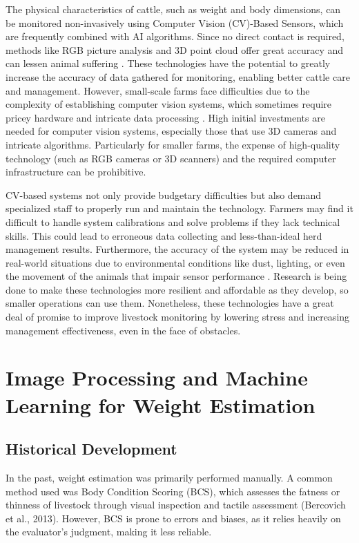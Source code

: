 {The physical characteristics of cattle, such as weight and body dimensions, can be monitored non-invasively using Computer Vision (CV)-Based Sensors, which are frequently combined with AI algorithms. Since no direct contact is required, methods like RGB picture analysis and 3D point cloud offer great accuracy and can lessen animal suffering \citep{ma2024computer}. These technologies have the potential to greatly increase the accuracy of data gathered for monitoring, enabling better cattle care and management. However, small-scale farms face difficulties due to the complexity of establishing computer vision systems, which sometimes require pricey hardware and intricate data processing \citep{terence2024systematic}.  High initial investments are needed for computer vision systems, especially those that use 3D cameras and intricate algorithms. Particularly for smaller farms, the expense of high-quality technology (such as RGB cameras or 3D scanners) and the required computer infrastructure can be prohibitive. 

CV-based systems not only provide budgetary difficulties but also demand specialized staff to properly run and maintain the technology. Farmers may find it difficult to handle system calibrations and solve problems if they lack technical skills. This could lead to erroneous data collecting and less-than-ideal herd management results. Furthermore, the accuracy of the system may be reduced in real-world situations due to environmental conditions like dust, lighting, or even the movement of the animals that impair sensor performance \citep{ma2024computer}. Research is being done to make these technologies more resilient and affordable as they develop, so smaller operations can use them. Nonetheless, these technologies have a great deal of promise to improve livestock monitoring by lowering stress and increasing management effectiveness, even in the face of obstacles.

\section{Image Processing and Machine Learning for Weight Estimation}

\subsection{Historical Development}

In the past, weight estimation was primarily performed manually. A common method used was Body Condition Scoring (BCS), which assesses the fatness or thinness of livestock through visual inspection and tactile assessment (Bercovich et al., 2013). However, BCS is prone to errors and biases, as it relies heavily on the evaluator's judgment, making it less reliable.

}
